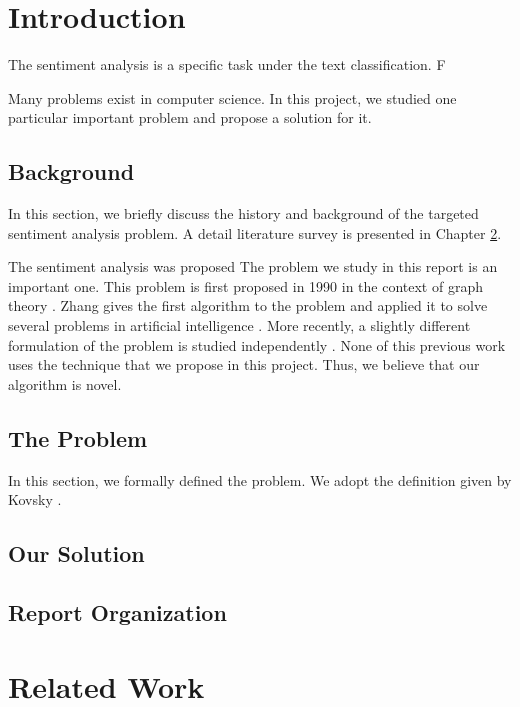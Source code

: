 \documentclass[fyp]{socreport}
\begin{document}
\listoffigures 
\listoftables
\tableofcontents 

\chapter{Introduction}
The sentiment analysis is a specific task under the text classification. F




Many problems exist in computer science.  In this project, we 
studied one particular important problem and propose a solution 
for it.  

\section{Background}
In this section, we briefly discuss the history and background
of the targeted sentiment analysis problem.  A detail literature survey is presented in 
Chapter \ref{ch:related}.

The sentiment analysis was proposed
The problem we study in this report is an important one.
This problem is first proposed in 1990 in the context
of graph theory \cite{smith90graph}.  Zhang gives the
first algorithm to the problem and applied it to solve several 
problems in artificial intelligence \cite{zhang91ai,zhang92ai}.  
More recently, a slightly different formulation of the problem
is studied independently \cite{kovsky92diff,ali94diff}.  None of this previous work
uses the technique that we propose in this project.  Thus, we 
believe that our algorithm is novel.

\section{The Problem}
In this section, we formally defined the problem.  We adopt
the definition given by Kovsky \cite{kovsky92diff}.

\section{Our Solution}
\section{Report Organization}

\chapter{Related Work}
\label{ch:related}
\end{document}
